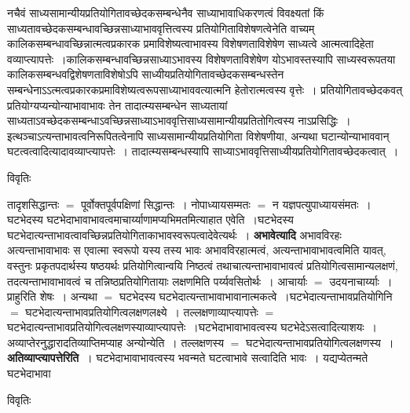 \documentclass[10pt, openany]{book}
\begin{document}
{{\la नचैवं साध्यसामान्यीयप्रतियोगितावच्छेदकसम्बन्धेनैव साध्याभावाधिकरणत्वं विवक्ष्यतां किं साध्यतावच्छेदकसम्बन्धावच्छिन्नसाध्याभाववृत्तित्वस्य प्रतियोगिताविशेषणत्वेनेति वाच्यम् कालिकसम्बन्धावच्छिन्नात्मत्वप्रकारक प्रमाविशेष्यत्वाभावस्य विशेषणताविशेषेण साध्यत्वे आत्मत्वादिहेता वव्याप्त्यापत्तेः~।कालिकसम्बन्धावच्छिन्नसाध्याऽभावस्य विशेषणताविशेषेण योऽभावस्तस्यापि साध्यस्वरूपतया कालिकसम्बन्धवद्विशेषणताविशेषोऽपि साध्यीयप्रतियोगितावच्छेदकसम्बन्धस्तेन सम्बन्धेनाऽऽत्मत्वप्रकारकप्रमाविशेष्यत्वरूपसाध्याभाववत्यात्मनि हेतोरात्मत्वस्य वृत्तेः~। प्रतियोगितावच्छेदकवत् प्रतियोग्यप्यन्योन्याभावाभावः तेन तादात्म्यसम्बन्धेन साध्यतायां साध्यताऽवच्छेदकसम्बन्धाऽवच्छिन्नसाध्याऽभाववृत्तिसाध्यसामान्यीयप्रतितोगित्वस्य नाऽप्रसिद्धिः~। इत्थञ्चाऽत्यन्ताभावत्वनिरूपितत्वेनापि साध्यसामान्यीयप्रतियोगिता विशेषणीया, अन्यथा घटान्योन्याभाववान् घटत्वत्वादित्यादावव्याप्त्यापत्तेः~। तादात्म्यसम्बन्धस्यापि साध्याऽभाववृत्तिसाध्यीयप्रतियोगितावच्छेदकत्वात्~।}
\begin{center}     विवृतिः \end{center}
तादृशसिद्धान्तः $=$ पूर्वोक्तपूर्वपक्षिणां सिद्धान्तः~। नोपाध्यायसम्मतः $=$ न यज्ञपत्युपाध्यायसंमतः~। घटभेदस्य घटभेदाभावाभावत्वमाचार्य्याणामप्यभिमतमित्याहात एवेति~।घटभेदस्य घटभेदात्यन्ताभावत्वावच्छिन्नप्रतियोगिताकाभावस्वरूपत्वादेवेत्यर्थः~। \textbf{\qt अभावेत्यादि }अभावविरहः अत्यन्ताभावाभावः स एवात्मा स्वरूपो यस्य तस्य भावः अभावविरहात्मत्वं, अत्यन्ताभावाभावत्वमिति यावत्, वस्तुनः प्रकृतपदार्थस्य षष्ठयर्थः प्रतियोगित्वान्वयि निष्ठत्वं तथाचात्यन्ताभावाभावत्वं प्रतियोगित्वसामान्यलक्षणं, तदत्यन्ताभावाभावत्वं च तन्निष्ठप्रतियोगितायाः लक्षणमिति पर्य्यवसितोर्थः~। आचार्याः $=$ उदयनाचार्य्याः~। प्राहुरिति शेषः~। अन्यथा $=$ घटभेदस्य घटभेदात्यन्ताभावाभावानात्मकत्वे~।घटभेदात्यन्ताभावप्रतियोगिनि $=$ घटभेदात्यन्ताभावप्रतियोगित्वलक्षणलक्ष्ये~। तल्लक्षणाव्याप्त्यापत्तेः $=$ घटभेदात्यन्ताभावप्रतियोगित्वलक्षणस्याव्याप्त्यापत्तेः~।घटभेदाभावाभावत्वस्य घटभेदेऽसत्वादित्याशयः~। अव्याप्तेरनुद्धारादतिव्याप्तिमप्याह \textendash अन्योन्येति~। तल्लक्षणस्य $=$  घटभेदात्यन्ताभावप्रतियोगित्वलक्षणस्य~। \textbf{\qt अतिव्याप्त्यापत्तेरिति~}। घटभेदाभावाभावत्वस्य भवन्मते घटत्वाभावे सत्वादिति भावः~। यद्यप्येतन्मते घटभेदाभावा
\newpage
\begin{center}     विवृतिः \end{center}
}
\end{document}
